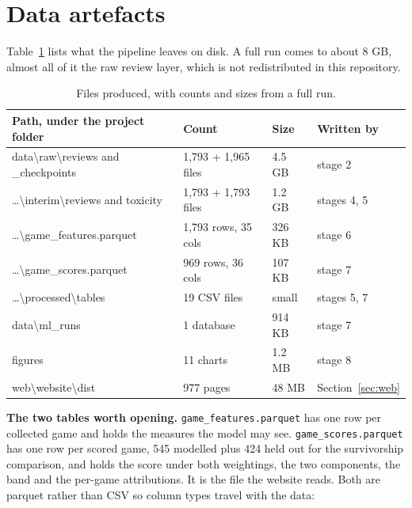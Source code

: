 \section{Data artefacts}
\label{sec:artefacts}

Table~\ref{tab:artefacts} lists what the pipeline leaves on disk. A full run comes to about
8 GB, almost all of it the raw review layer, which is not redistributed in this repository.

\begin{table}[htbp]
\centering
\caption{Files produced, with counts and sizes from a full run.}
\label{tab:artefacts}
\small
\begin{tabular}{|p{5.4cm}|p{3.0cm}|p{1.8cm}|p{3.0cm}|}
\hline
\textbf{Path, under the project folder} & \textbf{Count} & \textbf{Size} & \textbf{Written by} \\
\hline
data\textbackslash raw\textbackslash reviews and \_checkpoints & 1,793 + 1,965 files & 4.5 GB &
stage 2 \\
\hline
\ldots\textbackslash interim\textbackslash reviews and toxicity & 1,793 + 1,793 files & 1.2 GB &
stages 4, 5 \\
\hline
\ldots\textbackslash game\_features.parquet & 1,793 rows, 35 cols & 326 KB & stage 6 \\
\hline
\ldots\textbackslash game\_scores.parquet & 969 rows, 36 cols & 107 KB & stage 7 \\
\hline
\ldots\textbackslash processed\textbackslash tables & 19 CSV files & small & stages 5, 7 \\
\hline
data\textbackslash ml\_runs & 1 database & 914 KB & stage 7 \\
\hline
figures & 11 charts & 1.2 MB & stage 8 \\
\hline
web\textbackslash website\textbackslash dist & 977 pages & 48 MB & Section~\ref{sec:web} \\
\hline
\end{tabular}
\end{table}

\textbf{The two tables worth opening.} \texttt{game\_features.parquet} has one row per collected
game and holds the measures the model may see. \texttt{game\_scores.parquet} has one row per scored
game, 545 modelled plus 424 held out for the survivorship comparison, and holds the score under
both weightings, the two components, the band and the per-game attributions. It is the file the
website reads. Both are parquet rather than CSV so column types travel with the data:

